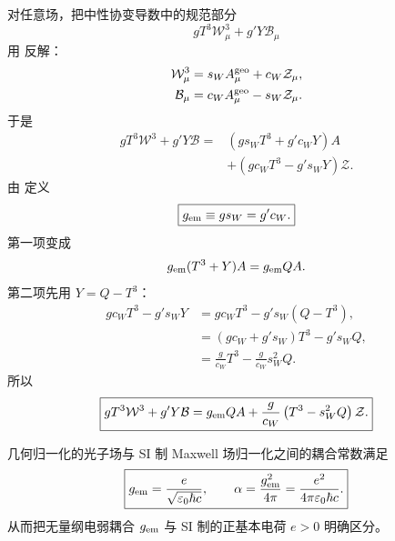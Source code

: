 \begin{proposition}
对任意场，把中性协变导数中的规范部分
\begin{equation*}
 gT^3\mathcal W_\mu^3+g'Y\mathcal B_\mu
\end{equation*}
用  反解：
\begin{align*}
 \mathcal W^3_\mu&=s_WA_\mu^{\rm geo}+c_W\mathcal Z_\mu,\\
 \mathcal B_\mu&=c_WA_\mu^{\rm geo}-s_W\mathcal Z_\mu.
\end{align*}
于是
\begin{align*}
 gT^3\mathcal W^3+g'Y\mathcal B
 =&\left(gs_WT^3+g'c_WY\right)A\\
 &+\left(gc_WT^3-g's_WY\right)\mathcal Z.
\end{align*}
由  定义
\begin{equation}
 \boxed{g_{\rm em}\equiv gs_W=g'c_W.}
 \label{eq:gem-definition-dp11}
\end{equation}
第一项变成
\begin{equation*}
 g_{\rm em}(T^3+Y)A
 =g_{\rm em}QA.
\end{equation*}
第二项先用 $Y=Q-T^3$：
\begin{align*}
 gc_WT^3-g's_WY
 &=gc_WT^3-g's_W(Q-T^3),\\
 &=\left(gc_W+g's_W\right)T^3-g's_WQ,\\
 &=\frac g{c_W}T^3-\frac g{c_W}s_W^2Q.
\end{align*}
所以
\begin{equation}
 \boxed{
 gT^3\mathcal W^3+g'Y\mathcal B
 =g_{\rm em}QA
 +\frac g{c_W}\left(T^3-s_W^2Q\right)\mathcal Z.}
 \label{eq:neutral-current-generator-dp11}
\end{equation}

几何归一化的光子场与 SI 制 Maxwell 场归一化之间的耦合常数满足
\begin{equation}
 \boxed{
 g_{\rm em}=\frac{e}{\sqrt{\varepsilon_0\hbar c}},
 \qquad
 \alpha=\frac{g_{\rm em}^2}{4\pi}
 =\frac{e^2}{4\pi\varepsilon_0\hbar c}.}
 \label{eq:gem-si-charge-dp11}
\end{equation}
从而把无量纲电弱耦合 $g_{\rm em}$ 与 SI 制的正基本电荷 $e>0$ 明确区分。
\end{proposition}

